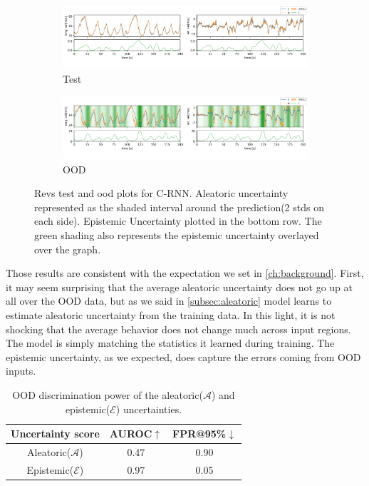 \begin{figure}[htbp]
  \centering
  
  \begin{subfigure}[b]{\textwidth}
    \includegraphics[width=\textwidth]{Experiments/figs/revs_test.png}
    \caption{Test}
  \end{subfigure}
  
  \begin{subfigure}[b]{\textwidth}
    \includegraphics[width=\textwidth]{Experiments/figs/revs_ood.png}
    \caption{OOD}
  \end{subfigure}
  
  \caption{Revs test and ood plots for C-RNN. Aleatoric uncertainty represented as the shaded interval around the prediction(2 stds on each side). Epistemic Uncertainty plotted in the bottom row. The green shading also represents the epistemic uncertainty overlayed over the graph.}
  \label{fig:Revs_run}
\end{figure}


Those results are consistent with the expectation we set in \cref{ch:background}. First, it may seem surprising that the average aleatoric uncertainty does not go up at all over the OOD data, but as we said in \cref{subsec:aleatoric} model learns to estimate aleatoric uncertainty from the training data. In this light, it is not shocking that the average behavior does not change much across input regions. The model is simply matching the statistics it learned during training. The epistemic uncertainty, as we expected, does capture the errors coming from OOD inputs. 

\begin{table}[htbp]
\centering
    \begin{tabular}{c  c  c}  
        \toprule
        Uncertainty score & AUROC$\uparrow$ & FPR@95\%$\downarrow$\\
        \midrule
        Aleatoric($\mathcal{A}$) & 0.47  & 0.90\\
        Epistemic($\mathcal{E}$) & 0.97 &  0.05 \\
        \midrule
    \end{tabular}
    \caption{OOD discrimination power of the aleatoric($\mathcal{A}$) and epistemic($\mathcal{E}$) uncertainties.}
    \label{tbl:revs_discrimination}
\end{table}


